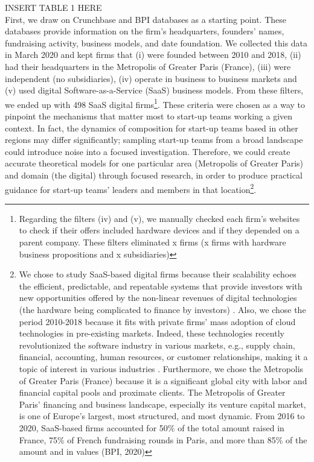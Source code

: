 \documentclass[12pt]{article}
\begin{document}
INSERT TABLE 1 HERE \\

First, we draw on Crunchbase and BPI databases as a starting point. These databases provide information on the firm's headquarters, founders' names, fundraising activity, business models, and date foundation. We collected this data in March 2020 and kept firms that (i) were founded between 2010 and 2018, (ii) had their headquarters in the Metropolis of Greater Paris (France), (iii) were independent (no subsidiaries), (iv) operate in business to business markets and (v) used digital Software-as-a-Service (SaaS) business models. From these filters, we ended up with 498 SaaS digital firms\footnote{Regarding the filters (iv) and (v), we manually checked each firm's websites to check if their offers included hardware devices and if they depended on a parent company. These filters eliminated x firms (x firms with hardware business propositions and x subsidiaries)}. These criteria were chosen as a way to pinpoint the mechanisms that matter most to start-up teams working a given context. In fact, the dynamics of composition for start-up teams based in other regions may differ significantly; sampling start-up teams from a broad landscape could introduce noise into a focused investigation. Therefore, we could create accurate theoretical models for one particular area (Metropolis of Greater Paris) and domain (the digital) through focused research, in order to produce practical guidance for start-up teams' leaders and members in that location\footnote{We chose to study SaaS-based digital firms because their scalability echoes the efficient, predictable, and repeatable systems that provide investors with new opportunities offered by the non-linear revenues of digital technologies (the hardware being complicated to finance by investors) \citep{nambisan2017digital}. Also, we chose the period 2010-2018 because it fits with private firms' mass adoption of cloud technologies in pre-existing markets. Indeed, these technologies recently revolutionized the software industry in various markets, e.g., supply chain, financial, accounting, human resources, or customer relationships, making it a topic of interest in various industries \citep{luoma2018exploring}. Furthermore, we chose the Metropolis of Greater Paris (France) because it is a significant global city with labor and financial capital pools and proximate clients. The Metropolis of Greater Paris' financing and business landscape, especially its venture capital market, is one of Europe's largest, most structured, and most dynamic. From 2016 to 2020, SaaS-based firms accounted for 50\% of the total amount raised in France, 75\% of French fundraising rounds in Paris, and more than 85\% of the amount and in values (BPI, 2020)}. \\
\end{document}
